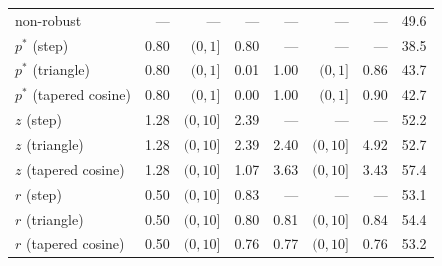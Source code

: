 \documentclass[
  a4paper,
]{article}
\begin{document}
\begin{table}
\begin{center}
\begin{tabular}{l r r r r r r r}
\midrule
non-robust               & ---  & ---       & ---  & ---  & ---       & ---  & 49.6 \\
$p^{*}$ (step)           & 0.80 & $(0, 1]$  & 0.80 & ---  & ---       & ---  & 38.5 \\
$p^{*}$ (triangle)       & 0.80 & $(0, 1]$  & 0.01 & 1.00 & $(0, 1]$  & 0.86 & 43.7 \\
$p^{*}$ (tapered cosine) & 0.80 & $(0, 1]$  & 0.00 & 1.00 & $(0, 1]$  & 0.90 & 42.7 \\
$z$ (step)               & 1.28 & $(0, 10]$ & 2.39 & ---  & ---       & ---  & 52.2 \\
$z$ (triangle)           & 1.28 & $(0, 10]$ & 2.39 & 2.40 & $(0, 10]$ & 4.92 & 52.7 \\
$z$ (tapered cosine)     & 1.28 & $(0, 10]$ & 1.07 & 3.63 & $(0, 10]$ & 3.43 & 57.4 \\
$r$ (step)               & 0.50 & $(0, 10]$ & 0.83 & ---  & ---       & ---  & 53.1 \\
$r$ (triangle)           & 0.50 & $(0, 10]$ & 0.80 & 0.81 & $(0, 10]$ & 0.84 & 54.4 \\
$r$ (tapered cosine)     & 0.50 & $(0, 10]$ & 0.76 & 0.77 & $(0, 10]$ & 0.76 & 53.2 \\
\bottomrule
\end{tabular}
\end{center}
\end{table}
\end{document}
